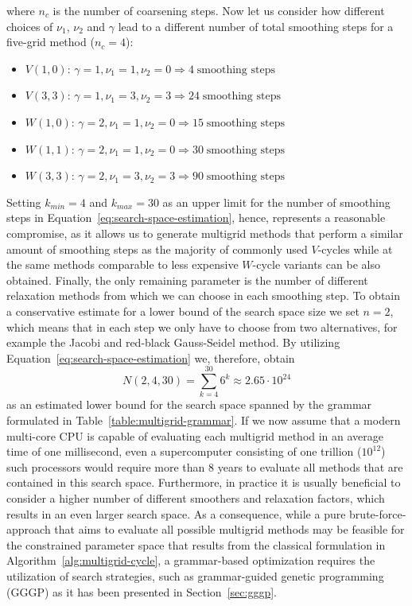 where $n_c$ is the number of coarsening steps.
Now let us consider how different choices of $\nu_1$, $\nu_2$ and $\gamma$ lead to a different number of total smoothing steps for a five-grid method ($n_c = 4$):
\begin{itemize}
	\item $V(1,0)$: $\gamma = 1, \nu_1 = 1, \nu_2 = 0 \Rightarrow 4 \; \text{smoothing steps}$
	\item $V(3,3)$: $\gamma = 1, \nu_1 = 3, \nu_2 = 3 \Rightarrow 24 \; \text{smoothing steps}$
	\item $W(1,0)$: $\gamma = 2, \nu_1 = 1, \nu_2 = 0 \Rightarrow 15 \; \text{smoothing steps}$
	\item $W(1,1)$: $\gamma = 2, \nu_1 = 1, \nu_2 = 0 \Rightarrow 30 \; \text{smoothing steps}$
	\item $W(3,3)$: $\gamma = 2, \nu_1 = 3, \nu_2 = 3 \Rightarrow 90 \; \text{smoothing steps}$
\end{itemize}
Setting $k_{min} = 4$ and $k_{max} = 30$ as an upper limit for the number of smoothing steps in Equation~\ref{eq:search-space-estimation}, hence, represents a reasonable compromise, as it allows us to generate multigrid methods that perform a similar amount of smoothing steps as the majority of commonly used $V$-cycles while at the same methods comparable to less expensive $W$-cycle variants can be also obtained.
Finally, the only remaining parameter is the number of different relaxation methods from which we can choose in each smoothing step.
To obtain a conservative estimate for a lower bound of the search space size we set $n = 2$, which means that in each step we only have to choose from two alternatives, for example the Jacobi and red-black Gauss-Seidel method.
By utilizing Equation~\eqref{eq:search-space-estimation} we, therefore, obtain 
\begin{equation*}
	N(2, 4, 30) = \sum_{k = 4}^{30} 6^k \approx 2.65 \cdot 10^{24}
\end{equation*}
as an estimated lower bound for the search space spanned by the grammar formulated in Table~\ref{table:multigrid-grammar}.
If we now assume that a modern multi-core CPU is capable of evaluating each multigrid method in an average time of one millisecond,
even a supercomputer consisting of one trillion ($10^{12}$) such processors would require more than 8 years to evaluate all methods that are contained in this search space.
Furthermore, in practice it is usually beneficial to consider a higher number of different smoothers and relaxation factors, which results in an even larger search space.
As a consequence, while a pure brute-force-approach that aims to evaluate all possible multigrid methods may be feasible for the constrained parameter space that results from the classical formulation in Algorithm~\ref{alg:multigrid-cycle}, a grammar-based optimization requires the utilization of search strategies, such as grammar-guided genetic programming (GGGP) as it has been presented in Section~\ref{sec:gggp}.
